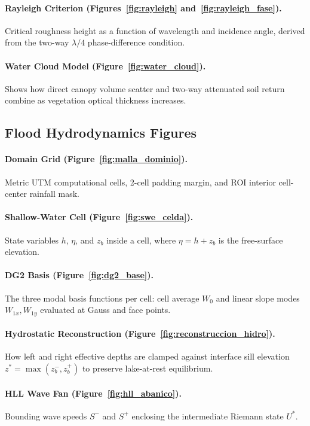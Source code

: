 \documentclass[11pt,a4paper]{article}
\begin{document}
\paragraph{Rayleigh Criterion (Figures~\ref{fig:rayleigh} and~\ref{fig:rayleigh_fase}).} Critical roughness height as a function of wavelength and incidence angle, derived from the two-way $\lambda/4$ phase-difference condition.

\paragraph{Water Cloud Model (Figure~\ref{fig:water_cloud}).} Shows how direct canopy volume scatter and two-way attenuated soil return combine as vegetation optical thickness increases.

\subsection*{Flood Hydrodynamics Figures}

\paragraph{Domain Grid (Figure~\ref{fig:malla_dominio}).} Metric UTM computational cells, 2-cell padding margin, and ROI interior cell-center rainfall mask.

\paragraph{Shallow-Water Cell (Figure~\ref{fig:swe_celda}).} State variables $h$, $\eta$, and $z_b$ inside a cell, where $\eta=h+z_b$ is the free-surface elevation.

\paragraph{DG2 Basis (Figure~\ref{fig:dg2_base}).} The three modal basis functions per cell: cell average $W_0$ and linear slope modes $W_{1x}, W_{1y}$ evaluated at Gauss and face points.

\paragraph{Hydrostatic Reconstruction (Figure~\ref{fig:reconstruccion_hidro}).} How left and right effective depths are clamped against interface sill elevation $z^*=\max(z_b^-,z_b^+)$ to preserve lake-at-rest equilibrium.

\paragraph{HLL Wave Fan (Figure~\ref{fig:hll_abanico}).} Bounding wave speeds $S^-$ and $S^+$ enclosing the intermediate Riemann state $U^*$.
\end{document}
